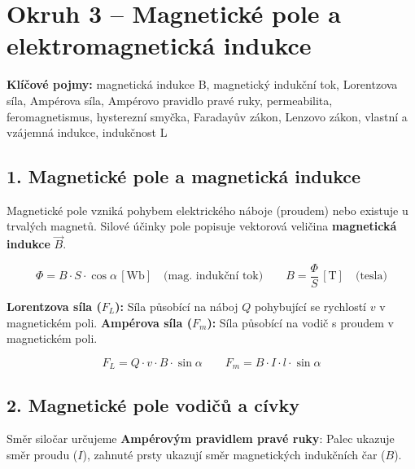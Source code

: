 \documentclass[a4paper,10pt]{article}
\newcommand{\jednotka}[1]{\,[\mathrm{#1}]}
\begin{document}
\section*{\large Okruh 3 – Magnetické pole a elektromagnetická indukce}

\begin{pojmybox}
\textbf{Klíčové pojmy:}
magnetická indukce B, magnetický indukční tok, Lorentzova síla, Ampérova síla, Ampérovo pravidlo pravé ruky, permeabilita, feromagnetismus, hysterezní smyčka, Faradayův zákon, Lenzovo zákon, vlastní a vzájemná indukce, indukčnost L
\end{pojmybox}

\begin{vysvetlenibox}

\subsection*{1. Magnetické pole a magnetická indukce}

Magnetické pole vzniká pohybem elektrického náboje (proudem) nebo existuje u trvalých magnetů. Silové účinky pole popisuje vektorová veličina \textbf{magnetická indukce} $\vec{B}$.

\begin{vzorcebox}
\[
\Phi = B \cdot S \cdot \cos \alpha \jednotka{Wb} \quad \text{(mag. indukční tok)}
\qquad
B = \frac{\Phi}{S} \jednotka{T} \quad \text{(tesla)}
\]
\end{vzorcebox}

\textbf{Lorentzova síla ($F_L$):} Síla působící na náboj $Q$ pohybující se rychlostí $v$ v magnetickém poli.
\textbf{Ampérova síla ($F_m$):} Síla působící na vodič s proudem v magnetickém poli.

\begin{vzorcebox}
\[
F_L = Q \cdot v \cdot B \cdot \sin \alpha
\qquad
F_m = B \cdot I \cdot l \cdot \sin \alpha
\]
\end{vzorcebox}

\subsection*{2. Magnetické pole vodičů a cívky}

Směr siločar určujeme \textbf{Ampérovým pravidlem pravé ruky}: Palec ukazuje směr proudu ($I$), zahnuté prsty ukazují směr magnetických indukčních čar ($B$).


\end{vysvetlenibox}
\end{document}
